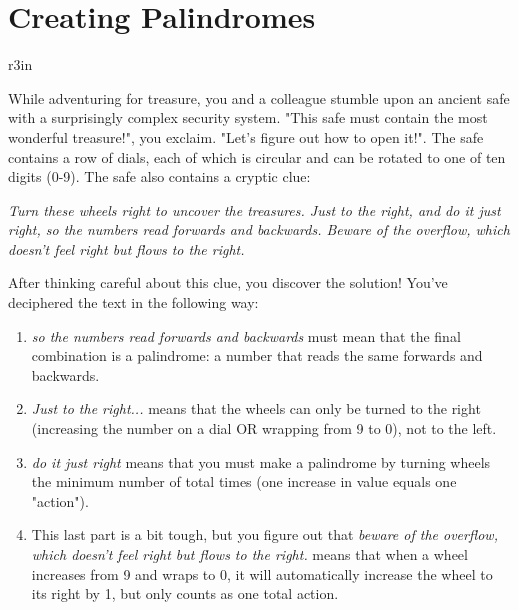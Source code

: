 \documentclass[11pt]{article}
\begin{document}
\section*{Creating Palindromes}

\begin{wrapfigure}{r}{3in}
\vspace{-10pt}
\vspace{-30pt}
\end{wrapfigure}

While adventuring for treasure, you and a colleague stumble upon an ancient safe with a surprisingly complex security system. "This safe must contain the most wonderful treasure!", you exclaim. "Let's figure out how to open it!". The safe contains a row of dials, each of which is circular and can be rotated to one of ten digits (0-9). The safe also contains a cryptic clue:

\emph{Turn these wheels right to uncover the treasures. Just to the right, and do it just right, so the numbers read forwards and backwards. Beware of the overflow, which doesn't feel right but flows to the right.}

After thinking careful about this clue, you discover the solution! You've deciphered the text in the following way:

\begin{enumerate}
\item \emph{so the numbers read forwards and backwards} must mean that the final combination is a palindrome: a number that reads the same forwards and backwards.
\item \emph{Just to the right...} means that the wheels can only be turned to the right (increasing the number on a dial OR wrapping from 9 to 0), not to the left.
\item \emph{do it just right} means that you must make a palindrome by turning wheels the minimum number of total times (one increase in value equals one "action").
\item This last part is a bit tough, but you figure out that \emph{beware of the overflow, which doesn't feel right but flows to the right.} means that when a wheel increases from 9 and wraps to 0, it will automatically increase the wheel to its right by 1, but only counts as one total action.
\end{enumerate}
\end{document}
